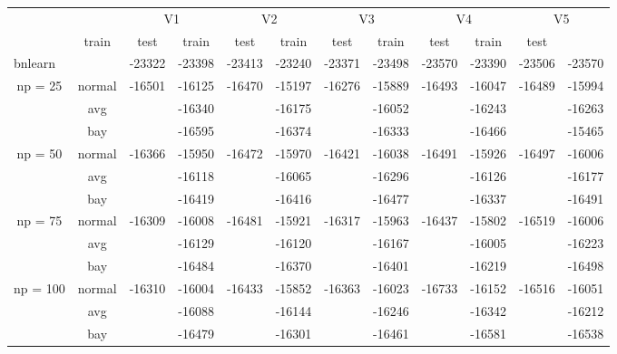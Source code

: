 \documentclass[]{scrartcl}
\begin{document}
\begin{scriptsize}
\begin{center}
\begin{tabular}{cc|cc|cc|cc|cc|cc}
 & & \multicolumn{2}{c}{V1} & \multicolumn{2}{c}{V2} & \multicolumn{2}{c}{V3} & \multicolumn{2}{c}{V4} & \multicolumn{2}{c}{V5} \\
  & train & test & train & test  & train & test  & train & test  & train & test  \\
  \multicolumn{2}{l|}{bnlearn} & -23322  & -23398  & -23413  & -23240  & -23371  & -23498  & -23570  & -23390  & -23506  & -23570  \\\hline\hline
       \multirow{3}{*}{np = 25} & normal & -16501 & -16125  & -16470  & -15197  & -16276  & -15889  & -16493  & -16047  & -16489  & -15994  \\
                                                    & avg        & & -16340 & & -16175  & & -16052  & & -16243  & & -16263 \\
                                                    & bay        & & -16595 & & -16374  & & -16333  & & -16466  & & -15465  \\\cline{1-12}
    \multirow{3}{*}{np = 50} & normal &-16366 & -15950  & -16472  &-15970  & -16421 & -16038 & -16491  & -15926  & -16497  & -16006 \\
    												& avg        & & -16118 & & -16065  & & -16296 & & -16126  & & -16177 \\
                                                     & bay        & & -16419 & & -16416 & & -16477 & & -16337  & & -16491 \\\cline{1-12}
  \multirow{3}{*}{np = 75} & normal & -16309  & -16008  & -16481  & -15921  &  -16317 & -15963  & -16437  & -15802  & -16519  & -16006 \\
    												   & avg        & & -16129  & & -16120  & & -16167  & & -16005  & & -16223 \\
                                                       & bay        & & -16484  & & -16370  & & -16401  & &  -16219  & & -16498 \\\cline{1-12}
 \multirow{3}{*}{np = 100} & normal & -16310  & -16004  & -16433  & -15852  & -16363  & -16023  & -16733  & -16152  & -16516  & -16051  \\
    												    & avg        & & -16088  & & -16144 & & -16246  & & -16342  & & -16212 \\
                                                        & bay        & & -16479  & & -16301 & & -16461  & & -16581  & & -16538 \\                                                                                                                
\end{tabular}
\end{center}
\end{scriptsize}
\end{document}
